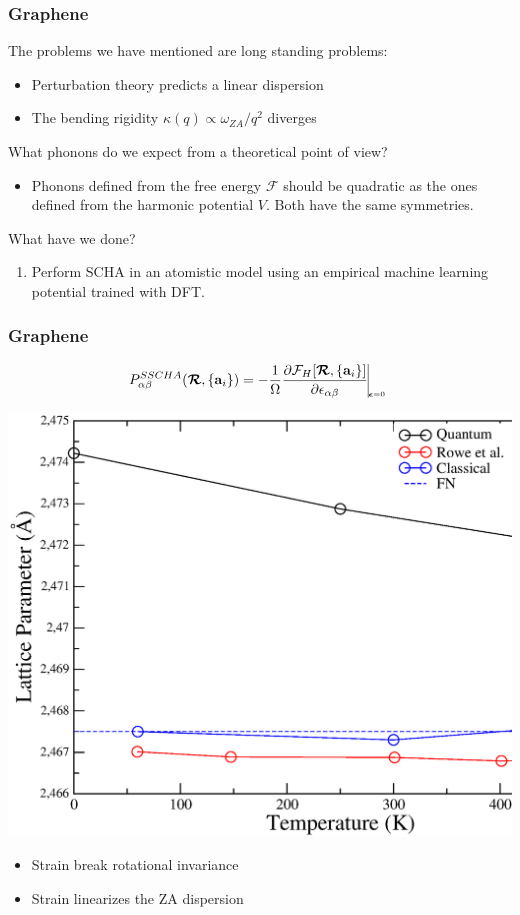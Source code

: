 \documentclass{beamer}
\begin{document}
\begin{frame}

\frametitle{Graphene}
The problems we have mentioned are long standing problems:
\begin{itemize}
\item Perturbation theory predicts a linear dispersion
\item The bending rigidity $\kappa(q)\propto\omega_{ZA}/q^{2}$ diverges
\end{itemize}
What phonons do we expect from a theoretical point of view?
\begin{itemize}
\item Phonons defined from the free energy $\mathcal{F}$ should be quadratic as the ones defined from the harmonic potential $V$. Both have the same symmetries.
\end{itemize}
What have we done?
\begin{enumerate}
 \item Perform SCHA in an atomistic model using an empirical machine learning potential trained with DFT.
\end{enumerate}

\end{frame}


\begin{frame}

\frametitle{Graphene}
\begin{equation}
\nonumber
 P_{\alpha\beta}^{SSCHA}(\boldsymbol{\mathcal{R}},\{\mathbf{a}_{i}\})=-\frac{1}{\Omega}\frac{\partial\mathcal{F}_{H}[\boldsymbol{\mathcal{R}},\{\mathbf{a}_{i}\}]}{\partial\epsilon_{\alpha\beta}}\vline_{_{_{_{_{_{_{_{
\boldsymbol{\epsilon}=0}}}}}}}}
\end{equation}
\begin{center}
 \includegraphics[width=0.60\linewidth]{Pictures/Graphene/lattice-new1.eps}
\end{center}
\begin{itemize}
 \item Strain break rotational invariance
 \item Strain linearizes the ZA dispersion
\end{itemize}

\end{frame}
\end{document}
